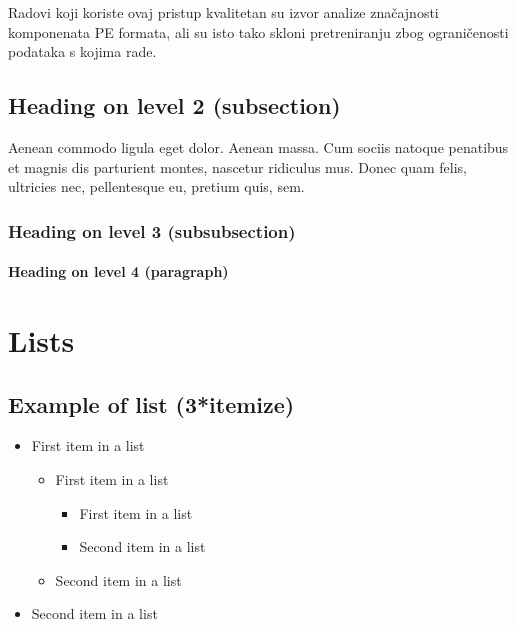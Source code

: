 \documentclass[paper=a4, fontsize=11pt]{scrartcl} %
\numberwithin{equation}{section} %
\numberwithin{figure}{section} %
\numberwithin{table}{section} %
\begin{document}
\vspace{3mm}

Radovi koji koriste ovaj pristup kvalitetan su izvor analize značajnosti komponenata PE formata, ali su isto
tako skloni pretreniranju zbog ograničenosti podataka s kojima rade. 


\iffalse
\subsection{Heading on level 2 (subsection)}

Aenean commodo ligula eget dolor. Aenean massa. Cum sociis natoque penatibus et magnis dis parturient montes, nascetur ridiculus mus. Donec quam felis, ultricies nec, pellentesque eu, pretium quis, sem.


\subsubsection{Heading on level 3 (subsubsection)}

\lipsum[3] %

\paragraph{Heading on level 4 (paragraph)}

\lipsum[6] %


\section{Lists}


\subsection{Example of list (3*itemize)}
\begin{itemize}
	\item First item in a list 
		\begin{itemize}
		\item First item in a list 
			\begin{itemize}
			\item First item in a list 
			\item Second item in a list 
			\end{itemize}
		\item Second item in a list 
		\end{itemize}
	\item Second item in a list 
\end{itemize}
\end{document}
